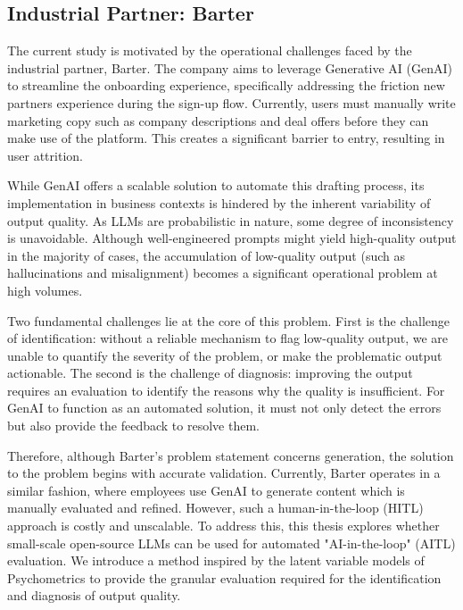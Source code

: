 \subsection{Industrial Partner: Barter}

The current study is motivated by the operational challenges faced by the industrial partner, Barter. The company aims to leverage Generative AI (GenAI) to streamline the onboarding experience, specifically addressing the friction new partners experience during the sign-up flow. Currently, users must manually write marketing copy such as company descriptions and deal offers before they can make use of the platform. This creates a significant barrier to entry, resulting in user attrition.

While GenAI offers a scalable solution to automate this drafting process, its implementation in business contexts is hindered by the inherent variability of output quality. As LLMs are probabilistic in nature, some degree of inconsistency is unavoidable. Although well-engineered prompts might yield high-quality output in the majority of cases, the accumulation of low-quality output (such as hallucinations and misalignment) becomes a significant operational problem at high volumes. 

Two fundamental challenges lie at the core of this problem. First is the challenge of identification: without a reliable mechanism to flag low-quality output, we are unable to quantify the severity of the problem, or make the problematic output actionable. The second is the challenge of diagnosis: improving the output requires an evaluation to identify the reasons why the quality is insufficient. For GenAI to function as an automated solution, it must not only detect the errors but also provide the feedback to resolve them.

Therefore, although Barter's problem statement concerns generation, the solution to the problem begins with accurate validation. Currently, Barter operates in a similar fashion, where employees use GenAI to generate content which is manually evaluated and refined. However, such a human-in-the-loop (HITL) approach is costly and unscalable. To address this, this thesis explores whether small-scale open-source LLMs can be used for automated "AI-in-the-loop" (AITL) evaluation. We introduce a method inspired by the latent variable models of Psychometrics to provide the granular evaluation required for the identification and diagnosis of output quality. 



